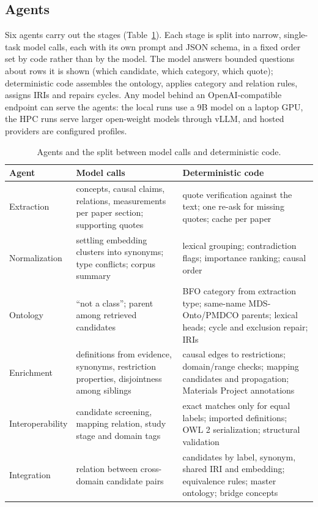 \subsection{Agents}

Six agents carry out the stages (Table~\ref{tab:agents}). Each stage is split into narrow, single-task model calls, each with its own prompt and JSON schema, in a fixed order set by code rather than by the model. The model answers bounded questions about rows it is shown (which candidate, which category, which quote); deterministic code assembles the ontology, applies category and relation rules, assigns IRIs and repairs cycles. Any model behind an OpenAI-compatible endpoint can serve the agents: the local runs use a 9B model on a laptop GPU, the HPC runs serve larger open-weight models through vLLM, and hosted providers are configured profiles.

\begin{table}[t]
\centering
\caption{Agents and the split between model calls and deterministic code.}\label{tab:agents}
\small
\begin{tabular}{p{2.2cm}p{6.3cm}p{6.3cm}}
\hline
Agent & Model calls & Deterministic code \\
\hline
Extraction & concepts, causal claims, relations, measurements per paper section; supporting quotes & quote verification against the text; one re-ask for missing quotes; cache per paper \\
Normalization & settling embedding clusters into synonyms; type conflicts; corpus summary & lexical grouping; contradiction flags; importance ranking; causal order \\
Ontology & ``not a class''; parent among retrieved candidates & BFO category from extraction type; same-name MDS-Onto/PMDCO parents; lexical heads; cycle and exclusion repair; IRIs \\
Enrichment & definitions from evidence, synonyms, restriction properties, disjointness among siblings & causal edges to restrictions; domain/range checks; mapping candidates and propagation; Materials Project annotations \\
Interoperability & candidate screening, mapping relation, study stage and domain tags & exact matches only for equal labels; imported definitions; OWL 2 serialization; structural validation \\
Integration & relation between cross-domain candidate pairs & candidates by label, synonym, shared IRI and embedding; equivalence rules; master ontology; bridge concepts \\
\hline
\end{tabular}
\end{table}

